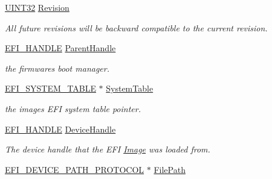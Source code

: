 \begin{DoxyCompactItemize}
\item 
\hyperlink{_processor_bind_8h_ae1e6edbbc26d6fbc71a90190d0266018}{U\+I\+N\+T32} \hyperlink{struct_e_f_i___l_o_a_d_e_d___i_m_a_g_e___p_r_o_t_o_c_o_l_a6b0ddaba01d4136da11f30772d583c85}{Revision}
\begin{DoxyCompactList}\small\item\em All future revisions will be backward compatible to the current revision. \end{DoxyCompactList}\item 
\hyperlink{_uefi_base_type_8h_af943d518ce8a229e7e51ce3fed0e3122}{E\+F\+I\+\_\+\+H\+A\+N\+D\+LE} \hyperlink{struct_e_f_i___l_o_a_d_e_d___i_m_a_g_e___p_r_o_t_o_c_o_l_ad99992b13b44e601714b2b7a4aa35099}{Parent\+Handle}
\begin{DoxyCompactList}\small\item\em the firmware\textquotesingle{}s boot manager. \end{DoxyCompactList}\item 
\mbox{\label{struct_e_f_i___l_o_a_d_e_d___i_m_a_g_e___p_r_o_t_o_c_o_l_adb5f97bd37bebafaeaac74ca4e3a17ab}} 
\hyperlink{struct_e_f_i___s_y_s_t_e_m___t_a_b_l_e}{E\+F\+I\+\_\+\+S\+Y\+S\+T\+E\+M\+\_\+\+T\+A\+B\+LE} $\ast$ \hyperlink{struct_e_f_i___l_o_a_d_e_d___i_m_a_g_e___p_r_o_t_o_c_o_l_adb5f97bd37bebafaeaac74ca4e3a17ab}{System\+Table}
\begin{DoxyCompactList}\small\item\em the image\textquotesingle{}s E\+FI system table pointer. \end{DoxyCompactList}\item 
\mbox{\label{struct_e_f_i___l_o_a_d_e_d___i_m_a_g_e___p_r_o_t_o_c_o_l_a553847c3bcc0f8dbf525f0ac706c460f}} 
\hyperlink{_uefi_base_type_8h_af943d518ce8a229e7e51ce3fed0e3122}{E\+F\+I\+\_\+\+H\+A\+N\+D\+LE} \hyperlink{struct_e_f_i___l_o_a_d_e_d___i_m_a_g_e___p_r_o_t_o_c_o_l_a553847c3bcc0f8dbf525f0ac706c460f}{Device\+Handle}
\begin{DoxyCompactList}\small\item\em The device handle that the E\+FI \hyperlink{class_image}{Image} was loaded from. \end{DoxyCompactList}\item 
\hyperlink{struct_e_f_i___d_e_v_i_c_e___p_a_t_h___p_r_o_t_o_c_o_l}{E\+F\+I\+\_\+\+D\+E\+V\+I\+C\+E\+\_\+\+P\+A\+T\+H\+\_\+\+P\+R\+O\+T\+O\+C\+OL} $\ast$ \hyperlink{struct_e_f_i___l_o_a_d_e_d___i_m_a_g_e___p_r_o_t_o_c_o_l_a12fde063d40994d91e74b4d284ef2409}{File\+Path}

\end{DoxyCompactItemize}

